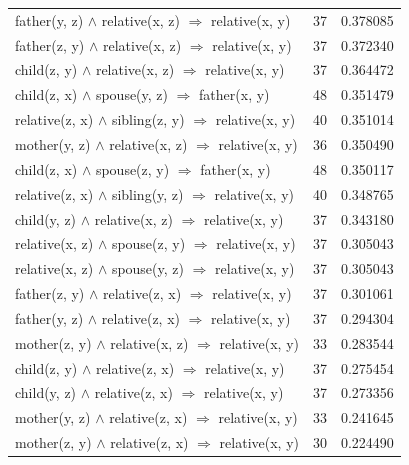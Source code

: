 \begin{longtable}{lrr}
  father(y, z) $\wedge$ relative(x, z)   $\Rightarrow$ relative(x, y) &           37 &        0.378085 \\
  father(z, y) $\wedge$ relative(x, z)   $\Rightarrow$ relative(x, y) &           37 &        0.372340 \\
   child(z, y) $\wedge$ relative(x, z)   $\Rightarrow$ relative(x, y) &           37 &        0.364472 \\
       child(z, x) $\wedge$ spouse(y, z)   $\Rightarrow$ father(x, y) &           48 &        0.351479 \\
 relative(z, x) $\wedge$ sibling(z, y)   $\Rightarrow$ relative(x, y) &           40 &        0.351014 \\
  mother(y, z) $\wedge$ relative(x, z)   $\Rightarrow$ relative(x, y) &           36 &        0.350490 \\
       child(z, x) $\wedge$ spouse(z, y)   $\Rightarrow$ father(x, y) &           48 &        0.350117 \\
 relative(z, x) $\wedge$ sibling(y, z)   $\Rightarrow$ relative(x, y) &           40 &        0.348765 \\
   child(y, z) $\wedge$ relative(x, z)   $\Rightarrow$ relative(x, y) &           37 &        0.343180 \\
  relative(x, z) $\wedge$ spouse(z, y)   $\Rightarrow$ relative(x, y) &           37 &        0.305043 \\
  relative(x, z) $\wedge$ spouse(y, z)   $\Rightarrow$ relative(x, y) &           37 &        0.305043 \\
  father(z, y) $\wedge$ relative(z, x)   $\Rightarrow$ relative(x, y) &           37 &        0.301061 \\
  father(y, z) $\wedge$ relative(z, x)   $\Rightarrow$ relative(x, y) &           37 &        0.294304 \\
  mother(z, y) $\wedge$ relative(x, z)   $\Rightarrow$ relative(x, y) &           33 &        0.283544 \\
   child(z, y) $\wedge$ relative(z, x)   $\Rightarrow$ relative(x, y) &           37 &        0.275454 \\
   child(y, z) $\wedge$ relative(z, x)   $\Rightarrow$ relative(x, y) &           37 &        0.273356 \\
  mother(y, z) $\wedge$ relative(z, x)   $\Rightarrow$ relative(x, y) &           33 &        0.241645 \\
  mother(z, y) $\wedge$ relative(z, x)   $\Rightarrow$ relative(x, y) &           30 &        0.224490 \\

\end{longtable}
